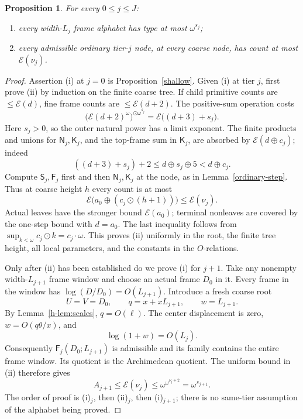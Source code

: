 \documentclass[11pt]{article}
\newtheorem{proposition}[theorem]{Proposition}
\theoremstyle{definition}
\theoremstyle{remark}
\newcommand{\hs}{\mathbin{\oplus}}
\newcommand{\od}{\mathbin{\odot}}
\newcommand{\EE}{\mathcal E}
\newcommand{\NN}{\mathsf N}
\newcommand{\SSS}{\mathsf S}
\newcommand{\KK}{\mathsf K}
\newcommand{\FF}{\mathsf F}
\numberwithin{equation}{section}
\begin{document}
\begin{proposition}\label{h-prop:bootstrap}
For every \(0\le j\le J\):
\begin{enumerate}[label=\textup{(\roman*)},leftmargin=2.5em]
\item every width-\(L_j\) frame alphabet has type at most
\(\omega^{s_j}\);
\item every admissible ordinary tier-\(j\) node, at every coarse
node, has count at most \(\EE(\nu_j)\).
\end{enumerate}
\end{proposition}
\begin{proof}
Assertion (i) at \(j=0\) is Proposition~\ref{shallow}.
Given (i) at tier \(j\), first prove (ii) by induction on the
finite coarse tree. If child primitive counts are \(\le\EE(d)\),
fine frame counts are \(\le\EE(d+2)\). The positive-sum operation
costs
\begin{equation}
 \bigl(\EE(d+2)^\omega\bigr)^{\od\omega^{s_j}}
       =\EE\bigl((d+3)+s_j\bigr).
 \label{h-eq-5.2}
\end{equation}
Here \(s_j>0\), so the outer natural power has a limit exponent.
The finite products and unions for \(\NN_j,\KK_j\), and the
top-frame sum in \(\KK_j\), are absorbed by
\(\EE(d\hs c_j)\); indeed
\[
 ((d+3)+s_j)+2\le d\hs s_j\hs5<d\hs c_j.
\]
Compute \(\SSS_j,\FF_j\) first and
then \(\NN_j,\KK_j\) at the node, as in Lemma~\ref{ordinary-step}.
Thus at coarse height \(h\) every count is at most
\begin{equation}
 \EE\bigl(a_0\hs(c_j\od(h+1))\bigr)\le\EE(\nu_j).
 \label{h-eq-5.3}
\end{equation}
Actual leaves have the stronger bound \(\EE(a_0)\); terminal
nonleaves are covered by the one-step bound with \(d=a_0\).
The last inequality follows from
\(\sup_{k<\omega}c_j\od k=c_j\cdot\omega\).
This proves (ii) uniformly in the root, the finite tree height,
all local parameters, and the constants in the \(O\)-relations.

Only after (ii) has been established do we prove (i) for \(j+1\).
Take any nonempty width-\(L_{j+1}\) frame window and choose an
actual frame \(D_0\) in it. Every frame in the window has
\(\log(D/D_0)=O(L_{j+1})\). Introduce a fresh coarse root
\begin{equation}
 U=V=D_0,\qquad q=x+xL_{j+1},\qquad w=L_{j+1}.
 \label{h-eq-5.4}
\end{equation}
By Lemma~\ref{h-lem:scales}, \(q=O(\ell)\).
The center displacement is zero,
\(w=O(q\theta/x)\), and
\[
 \log(1+w)=O(L_j).
\]
Consequently \(\FF_j(D_0;L_{j+1})\) is admissible and its
family contains the entire frame window. Its quotient is the
Archimedean quotient. The uniform bound in (ii) therefore gives
\begin{equation}
 A_{j+1}\le\EE(\nu_j)
       \le\omega^{\omega^{\nu_j+2}}=\omega^{s_{j+1}}.
 \label{h-eq-5.5}
\end{equation}
The order of proof is (i)\(_j\), then (ii)\(_j\), then
(i)\(_{j+1}\); there is no same-tier assumption of the alphabet
being proved.
\end{proof}
\end{document}
